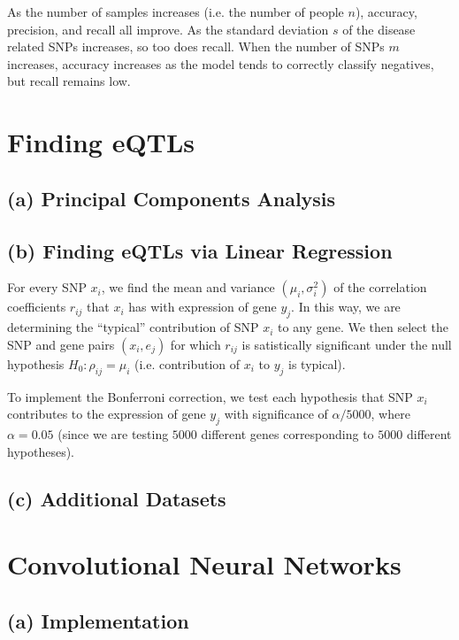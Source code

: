 \documentclass{article}[11pt]
\begin{document}
As the number of samples increases (i.e. the number of people $n$),
accuracy, precision, and recall all improve. As the standard
deviation $s$ of the disease related SNPs increases, so too does
recall. When the number of SNPs $m$ increases, accuracy increases
as the model tends to correctly classify negatives, but recall
remains low.

\section{Finding eQTLs}

\subsection*{(a) Principal Components Analysis}

\subsection*{(b) Finding eQTLs via Linear Regression}
For every SNP $x_i$, we find the mean and variance
$(\mu_{i}, \sigma_{i}^2)$ of the correlation coefficients $r_{ij}$ that 
$x_i$ has with expression of gene $y_j$. In this way, we are determining
the ``typical'' contribution of SNP $x_i$ to any gene.
We then select the SNP and gene pairs $(x_i, e_j)$ for which
$r_{ij}$ is satistically significant
under the null hypothesis $H_0: \rho_{ij} = \mu_{i}$ (i.e. contribution
of $x_i$ to $y_j$ is typical).

To implement the Bonferroni correction, we test
each hypothesis that SNP $x_i$ contributes
to the expression of gene $y_j$ with significance
of $\alpha / 5000$, where $\alpha = 0.05$ (since we are testing
$5000$ different genes corresponding to $5000$ different hypotheses).

\subsection*{(c) Additional Datasets}

\section{Convolutional Neural Networks}
\subsection*{(a) Implementation}
\end{document}
